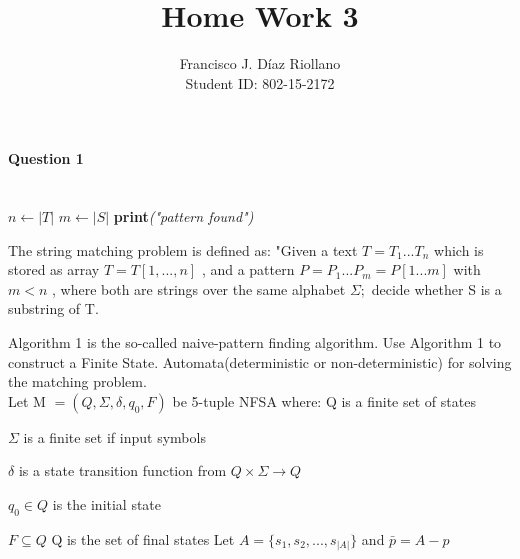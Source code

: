 \documentclass{report}
\title{Home Work 3}
\author{Francisco J. Díaz Riollano \\ Student ID: 802-15-2172 }
\newcommand{\me}[1]{
\begin{math}
#1
\end{math}
}
\begin{document}
\maketitle
\paragraph{\Large{Question 1\\ \\}}


\begin{algorithm}
  \begin{algorithmic}[1]
      \State $n\gets |T|$
      \State $m\gets |S|$
      	\State \textbf{print}\textit{("pattern found")}
      \EndIf
      \EndFor     
    \EndProcedure
  \end{algorithmic}
\end{algorithm}


The string matching problem is defined as: "Given a text \me{T=T_1 ... T_n} which is stored as array \me{T= T[1,...,n]} , and a pattern \me{P = P_1 ... P_m = P[1...m]} with \me{m<n}, where both are strings over the same alphabet \me{\Sigma;}decide whether S is a substring of T.

Algorithm 1 is the so-called naive-pattern finding algorithm. Use Algorithm 1 to construct a Finite State. Automata(deterministic or non-deterministic) for solving the matching problem. 
\\

Let M \me{=(Q,\Sigma,\delta,q_0,F)} be 5-tuple NFSA where: \newline
Q is a finite set of states \newline
\me{\Sigma} is a finite set if input symbols \newline
\me{\delta} is a state transition function from \me{Q \times \Sigma \rightarrow Q} \newline
\me{q_0 \in Q} is the initial state \newline
\me{F \subseteq Q} Q is the set of final states \newline
Let \me{A=\{s_1,s_2,...,s_{|A|}\}} and \me{\bar{p} = A -p} 
\end{document}
